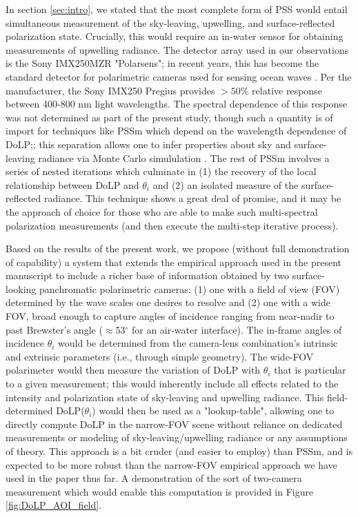 \documentclass[letterpaper,journal]{IEEEtran}
\begin{document}
	In section \ref{sec:intro}, we stated that the most complete form of PSS would entail simultaneous measurement of the sky-leaving, upwelling, and surface-reflected polarization state. Crucially, this would require an in-water sensor for obtaining measurements of upwelling radiance. The detector array used in our observations is the Sony IMX250MZR "Polarsens"; in recent years, this has become the standard detector for polarimetric cameras used for sensing ocean waves \cite{laxague_effects_2025}. Per the manufacturer, the Sony IMX250 Pregius provides $>50$\% relative response between 400-800 nm light wavelengths. The spectral dependence of this response was not determined as part of the present study, though such a quantity is of import for techniques like PSSm \cite{malinowski_surface_2024} which depend on the wavelength dependence of DoLP;; this separation allows one to infer properties about sky and surface-leaving radiance via Monte Carlo simululation \cite{foster_characterization_2015,foster_polarized_2016}. The rest of PSSm involves a series of nested iterations which culminate in (1) the recovery of the local relationship between DoLP and $\theta_i$ and (2) an isolated measure of the surface-reflected radiance. This technique shows a great deal of promise, and it may be the approach of choice for those who are able to make such multi-spectral polarization measurements (and then execute the multi-step iterative process).
	
	Based on the results of the present work, we propose (without full demonstration of capability) a system that extends the empirical approach used in the present manuscript to include a richer base of information obtained by two surface-looking panchromatic polarimetric cameras: (1) one with a field of view (FOV) determined by the wave scales one desires to resolve and (2) one with a wide FOV, broad enough to capture angles of incidence ranging from near-nadir to past Brewster's angle ($\approx$53$^{\circ}$ for an air-water interface). The in-frame angles of incidence $\theta_i$ would be determined from the camera-lens combination's intrinsic and extrinsic parameters (i.e., through simple geometry). The wide-FOV polarimeter would then measure the variation of DoLP with $\theta_i$ that is particular to a given measurement; this would inherently include all effects related to the intensity and polarization state of sky-leaving and upwelling radiance. This field-determined DoLP($\theta_i$) would then be used as a "lookup-table", allowing one to directly compute DoLP in the narrow-FOV scene without reliance on dedicated measurements or modeling of sky-leaving/upwelling radiance \cite{foster_characterization_2015,foster_polarized_2016} or any assumptions of theory. This approach is a bit cruder (and easier to employ) than PSSm, and is expected to be more robust than the narrow-FOV empirical approach we have used in the paper thus far. A demonstration of the sort of two-camera measurement which would enable this computation is provided in Figure \ref{fig:DoLP_AOI_field}.
	
\end{document}
